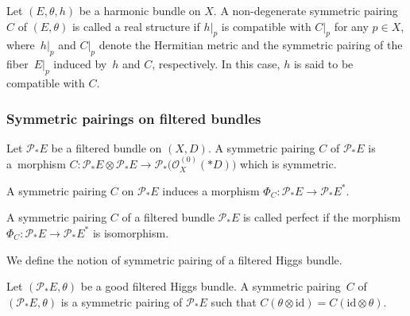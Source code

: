 \documentclass[10pt,a4paper]{amsart}
\numberwithin{equation}{section}
\newcommand{\id}{\mathrm{id}}
\newcommand{\strsheaf}{\mathcal{O}}
\begin{document}
\begin{Definition}
 Let $(E,\theta,h)$ be a harmonic bundle on $X$. A non-degenerate symmetric pairing~$C$ of $(E,\theta)$ is called a real structure if $h|_p$ is compatible with $C|_p$ for any $p\in X$, where~$h|_p$ and $C|_p$ denote the Hermitian metric and the symmetric pairing of the fiber~$E|_p$ induced by~$h$ and $C$, respectively. In this case, $h$ is said to be compatible with $C$.
\end{Definition}

\subsubsection{Symmetric pairings on filtered bundles}
\begin{Definition}
 Let $\mathcal{P}_{*}E$ be a filtered bundle on $(X,D)$. A symmetric pairing $C$ of $\mathcal{P}_{*}E$ is a~morphism $C\colon \mathcal{P}_{*}E\otimes \mathcal{P}_{*}E\to \mathcal{P}_{*} \bigl(\strsheaf_{X}^{(0)} (*D)\bigr)$ which is symmetric.
\end{Definition}
A symmetric pairing $C$ on $\mathcal{P}_{*}E$ induces a morphism $\Phi_C\colon \mathcal{P}_{*}E\to \mathcal{P}_{*}E^{*}$.
\begin{Definition}
 A symmetric pairing $C$ of a filtered bundle $\mathcal{P}_{*}E$ is called perfect if the morphism $\Phi_C\colon \mathcal{P}_{*}E\to\mathcal{P}_{*}E^{*}$ is isomorphism.
\end{Definition}
We define the notion of symmetric pairing of a filtered Higgs bundle.
\begin{Definition}
 Let $(\mathcal{P}_{*}E,\theta)$ be a good filtered Higgs bundle. A symmetric pairing~$C$ of~$(\mathcal{P}_{*}E,\theta)$ is a symmetric pairing of $\mathcal{P}_{*}E$ such that $C(\theta\otimes\id)=C(\id\otimes\theta)$.
\end{Definition}
\end{document}
